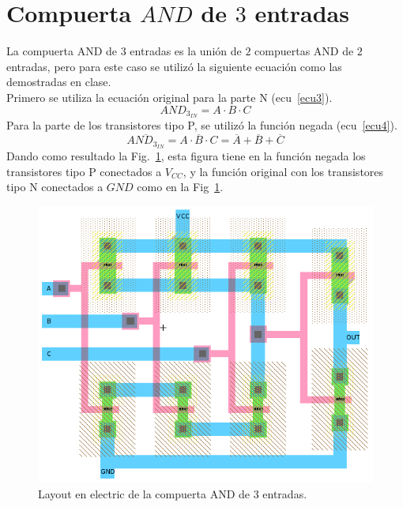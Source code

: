 \documentclass[twocolumn]{IEEEtran}
\begin{document}
\section{Compuerta $AND$ de $3$ entradas} \label{AND3}
\noindent
La compuerta AND de $3$ entradas es la unión de $2$ compuertas AND de $2$ entradas, pero para este caso se utilizó la siguiente ecuación como las demostradas en clase.\\
Primero se utiliza la ecuación original para la parte N (ecu~\ref{ecu3}).
\begin{equation}
 AND{_{{3_{IN}}}} = A \cdot B \cdot C
 \label{ecu3}
\end{equation}
\noindent
Para la parte de los transistores tipo P, se utilizó la función negada (ecu~\ref{ecu4}).
\begin{equation}
 \overline {AND{_{{3_{IN}}}}}  = \overline {A \cdot B \cdot C}  = \overline A  + \overline B  + \overline C 
 \label{ecu4}
\end{equation}
\noindent
Dando como resultado la Fig.~\ref{fig1}, esta figura tiene en la función negada los transistores tipo P conectados a $V_{CC}$, y la función original con los transistores tipo N conectados a $GND$ como en la Fig~\ref{fig1}.
\begin{figure}[H]
  \centering
    \includegraphics[scale=0.35]{./pics/lay_and_3.png}
      \caption{Layout en electric de la compuerta AND de $3$ entradas.}
	\label{fig1}
\end{figure}
\end{document}
